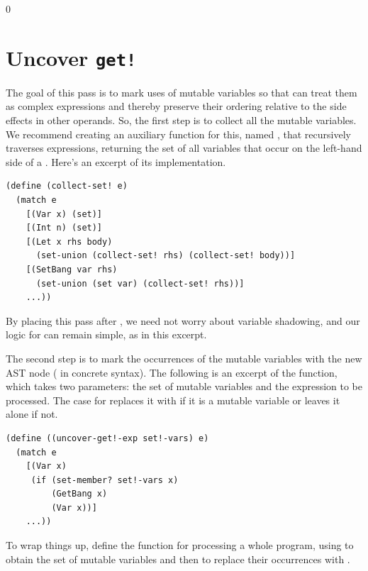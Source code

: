 \documentclass[7x10]{TimesAPriori_MIT}%
\def\racketEd{0}
\def\edition{1}
\numberwithin{theorem}{chapter}
\numberwithin{definition}{chapter}
\numberwithin{equation}{chapter}
\begin{document}
{\if\edition\racketEd
\section{Uncover \texttt{get!}}
\label{sec:uncover-get-bang}

The goal of this pass is to mark uses of mutable variables so that
 can treat them as complex expressions
and thereby preserve their ordering relative to the side effects in
other operands. So, the first step is to collect all the mutable
variables. We recommend creating an auxiliary function for this,
named , that recursively traverses expressions,
returning the set of all variables that occur on the left-hand side of a
. Here's an excerpt of its implementation.
\begin{center}
\begin{minipage}{\textwidth}
\begin{lstlisting}
(define (collect-set! e)
  (match e
    [(Var x) (set)]
    [(Int n) (set)]
    [(Let x rhs body)
      (set-union (collect-set! rhs) (collect-set! body))]
    [(SetBang var rhs)
      (set-union (set var) (collect-set! rhs))]
    ...))
\end{lstlisting}
\end{minipage}
\end{center}
By placing this pass after , we need not worry about
variable shadowing, and our logic for  can remain simple, as
in this excerpt.

The second step is to mark the occurrences of the mutable variables
with the new  AST node ( in concrete
syntax). The following is an excerpt of the 
function, which takes two parameters: the set of mutable variables
 and the expression  to be processed. The
case for  replaces it with  if it is a
mutable variable or leaves it alone if not.
\begin{center}
\begin{minipage}{\textwidth}
\begin{lstlisting}
(define ((uncover-get!-exp set!-vars) e)
  (match e
    [(Var x)
     (if (set-member? set!-vars x)
         (GetBang x)
         (Var x))]
    ...))
\end{lstlisting}
\end{minipage}
\end{center}

To wrap things up, define the  function for
processing a whole program, using  to obtain the
set of mutable variables and then  to replace
their occurrences with .


\fi}
\end{document}
